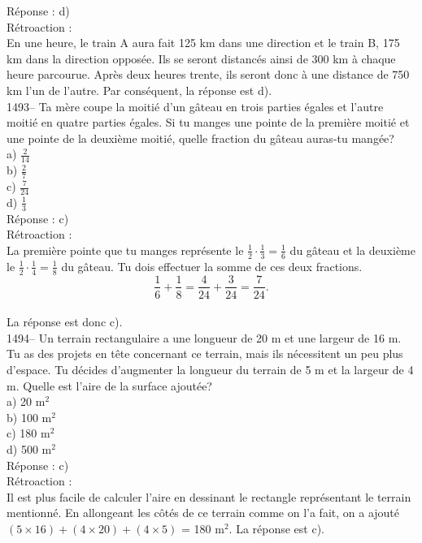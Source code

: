 R\'eponse : d)\\

R\'etroaction :\\
En une heure, le train A aura fait 125 km dans une direction et le
train B, 175 km dans la direction oppos\'ee. Ils se seront
distanc\'es ainsi de 300 km \`a chaque heure parcourue. Apr\`es deux
heures trente, ils seront donc \`a une distance de 750 km l'un de
l'autre.
Par cons\'equent, la r\'eponse est d).\\

1493-- Ta m\`ere coupe la moiti\'e d'un g\^ateau en trois parties
\'egales et l'autre moiti\'e en quatre parties \'egales. Si tu
manges une pointe de la premi\`ere moiti\'e et une pointe de la
deuxi\`eme moiti\'e, quelle fraction
du g\^ateau auras-tu mang\'ee?\\
a) $\frac{2}{14}$\\[3mm]
b) $\frac{2}{7}$\\[3mm]
c) $\frac{7}{24}$\\[3mm]
d) $\frac{1}{3}$\\[3mm]

R\'eponse : c)\\

R\'etroaction :\\
La premi\`ere pointe que tu manges repr\'esente le
$\frac{1}{2}\cdot\frac{1}{3}=\frac{1}{6}$ du g\^ateau et la
deuxi\`eme le $\frac{1}{2}\cdot\frac{1}{4}=\frac{1}{8}$ du g\^ateau.
Tu dois
effectuer la somme de ces deux fractions.\\
$$\frac{1}{6}+\frac{1}{8} = \frac{4}{24}+\frac{3}{24} =
\frac{7}{24}.$$\\
La r\'eponse est donc c).\\

1494-- Un terrain rectangulaire a une longueur de 20 m et une largeur
de 16 m. Tu as des projets en t\^ete concernant ce terrain, mais ils
n\'ecessitent un peu plus d'espace. Tu d\'ecides d'augmenter la
longueur du terrain de 5 m et la largeur de 4 m. Quelle est l'aire
de la surface ajout\'ee?\\
a) 20 m$^2$\\
b) 100 m$^2$\\
c) 180 m$^2$\\
d) 500 m$^2$\\

R\'eponse : c)\\

R\'etroaction :\\
Il est plus facile de calculer l'aire en dessinant le rectangle
repr\'esentant le terrain mentionn\'e. En allongeant les c\^ot\'es
de ce terrain comme on l'a fait, on a ajout\'e
$(5\times16)+(4\times20)+(4\times5)$ = 180 m$^2$.
La r\'eponse est c).\\



